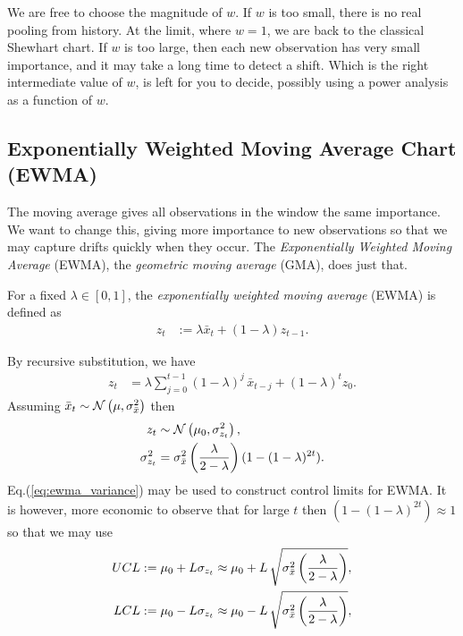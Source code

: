 We are free to choose the magnitude of $w$. 
If $w$ is too small, there is no real pooling from history. At the limit, where $w=1$, we are back to the classical Shewhart chart. 
If $w$ is too large, then each new observation has very small importance, and it may take a long time to detect a shift.
Which is the right intermediate value of $w$, is left for you to decide, possibly using a power analysis as a function of $w$. 






\subsection{Exponentially Weighted Moving Average Chart (EWMA)}
The moving average gives all observations in the window the same importance. 
We want to change this, giving more importance to new observations so that we may capture drifts quickly when they occur. 
The \emph{Exponentially Weighted Moving Average} (EWMA), \aka the \emph{geometric moving average} (GMA), does just that. 
\begin{definition}[EWMA]
For a fixed $\lambda \in [0,1]$, the \emph{exponentially weighted moving average} (EWMA) is defined as 
\begin{align}
	z_t &:= \lambda \bar{x}_t + (1-\lambda) z_{t-1}.
\end{align}
\end{definition}
By recursive substitution, we have 
\begin{align}
	z_t &= \lambda \sum_{j=0}^{t-1} (1-\lambda)^j \, \bar{x}_{t-j} + (1-\lambda)^t z_0.
\end{align}
Assuming $\bar{x}_{t} \sim \mathcal{N}\left(\mu, \sigma_{\bar{x}}^2\right)$ then  
\begin{align}
\label{eq:ewma_variance}
	z_t &\sim \mathcal{N}\left(\mu_0,	\sigma^2_{z_t} \right), \\
	\sigma^2_{z_t} &= \sigma_{\bar{x}}^2 \left( \frac{\lambda}{2-\lambda} \right)(1-(1-\lambda)^{2t}).
\end{align}
Eq.(\ref{eq:ewma_variance}) may be used to construct control limits for EWMA.
It is however, more economic to observe that for large $t$ then  $(1-(1-\lambda)^{2t}) \approx 1$ so that we may use 
\begin{align}
\begin{split}
\label{eq:ewma_variance_approximate}
	UCL &:= \mu_0 + L \sigma_{z_t} \approx \mu_0 + L \, \sqrt{\sigma_{\bar{x}}^2\left( \frac{\lambda}{2-\lambda} \right)},  \\
	LCL &:= \mu_0 - L \sigma_{z_t} \approx \mu_0 - L \, \sqrt{\sigma_{\bar{x}}^2\left( \frac{\lambda}{2-\lambda} \right)},
\end{split}
\end{align}
